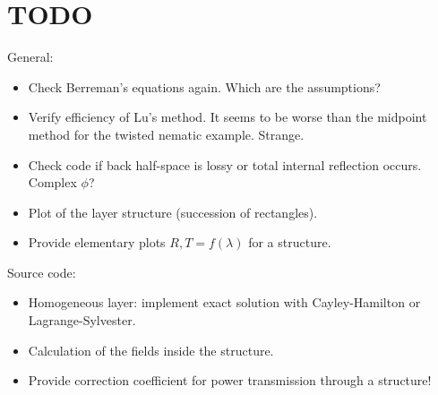 \section{TODO}

General:
\begin{itemize}
\item Check Berreman's equations again. Which are the assumptions?
\item Verify efficiency of Lu's method. It seems to be worse than the midpoint method for the twisted nematic example. Strange.
\item Check code if back half-space is lossy or total internal reflection occurs. Complex $\phi$?
\item Plot of the layer structure (succession of rectangles).
\item Provide elementary plots $R,T=f(\lambda)$ for a structure.
\end{itemize}
%
Source code:
\begin{itemize}
\item Homogeneous layer: implement exact solution with Cayley-Hamilton or Lagrange-Sylvester.
\item Calculation of the fields inside the structure.
\item Provide correction coefficient for power transmission through a structure!
\end{itemize}


